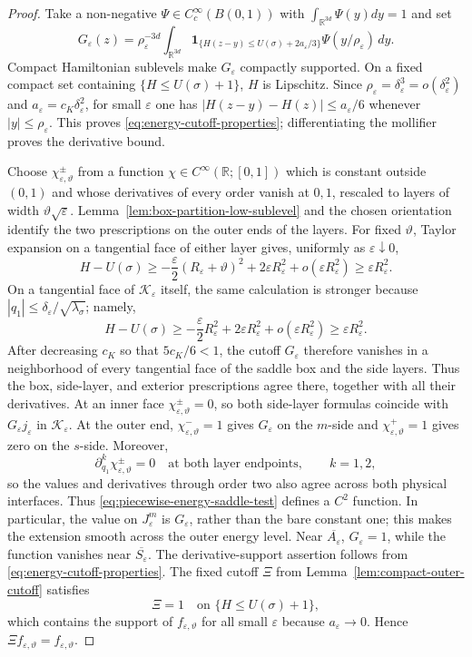 \documentclass[11pt]{article}
\numberwithin{equation}{section}
\theoremstyle{plain}
\theoremstyle{definition}
\theoremstyle{remark}
\newcommand{\R}{\mathbb R}
\newcommand{\eps}{\varepsilon}
\begin{document}
\begin{proof}
Take a non-negative $\Psi\in C_c^\infty(B(0,1))$ with $\int_{\mathbb{R}^{3d}}\Psi(y)dy=1$ and set
\begin{equation}
\label{eq:energy-cutoff-convolution}
G_\eps(z)=\rho_\eps^{-3d}\int_{\R^{3d}}
\mathbf 1_{\{H(z-y)\le U(\sigma)+2a_\eps/3\}}
\Psi(y/\rho_\eps)\,dy .
\end{equation}
Compact Hamiltonian sublevels make $G_\eps$ compactly supported.  On a fixed
compact set containing $\{H\le U(\sigma)+1\}$, $H$ is Lipschitz.  Since
$\rho_\eps=\delta_\eps^3=o(\delta_\eps^2)$ and
$a_\eps=c_K\delta_\eps^2$, for small $\eps$ one has
$|H(z-y)-H(z)|\le a_\eps/6$ whenever $|y|\le\rho_\eps$.
This proves \eqref{eq:energy-cutoff-properties}; differentiating the mollifier
proves the derivative bound.

Choose $\chi_{\eps,\vartheta}^\pm$ from a function
$\chi\in C^\infty(\R;[0,1])$ which is constant outside $(0,1)$ and whose
derivatives of every order vanish at $0,1$, rescaled to layers of width
$\vartheta\sqrt\eps$.  Lemma~\ref{lem:box-partition-low-sublevel} and the chosen
orientation identify the two prescriptions on the outer ends of the layers.
For fixed $\vartheta$, Taylor expansion on a tangential face of either layer
gives, uniformly as $\eps\downarrow0$,
\[
H-U(\sigma)
\ge
-\frac{\eps}{2}(R_\eps+\vartheta)^2
+2\eps R_\eps^2+o(\eps R_\eps^2)
\ge \eps R_\eps^2.
\]
On a tangential face of $\mathcal K_\eps$ itself, the same calculation is
stronger because $|q_1|\le\delta_\eps/\sqrt{\lambda_\sigma}$; namely,
\[
H-U(\sigma)
\ge -\frac{\eps}{2}R_\eps^2+2\eps R_\eps^2
+o(\eps R_\eps^2)
\ge \eps R_\eps^2.
\]
After decreasing $c_K$ so that $5c_K/6<1$, the cutoff $G_\eps$ therefore
vanishes in a neighborhood of every tangential face of the saddle box and
the side layers.  Thus the box, side-layer, and exterior prescriptions agree
there, together with all their derivatives.
At an inner face $\chi_{\eps,\vartheta}^\pm=0$, so both side-layer formulas
coincide with $G_\eps j_\eps$ in $\mathcal K_\eps$.  At the outer end,
$\chi_{\eps,\vartheta}^-=1$ gives $G_\eps$ on the $m$-side and
$\chi_{\eps,\vartheta}^+=1$ gives zero on the $s$-side.  Moreover,
\[
\partial_{q_1}^k\chi_{\eps,\vartheta}^\pm=0
\quad\text{at both layer endpoints},\qquad k=1,2,
\]
so the values and derivatives through order two also agree across both
physical interfaces.
Thus \eqref{eq:piecewise-energy-saddle-test} defines a $C^2$ function.  In
particular, the value on $J_\eps^m$ is $G_\eps$, rather than the bare constant
one; this makes the extension smooth across the outer energy level.  Near
$\overline{A_\eps}$, $G_\eps=1$, while the function vanishes near
$\overline{S_\eps}$.
The derivative-support assertion follows from
\eqref{eq:energy-cutoff-properties}.  The fixed cutoff $\Xi$ from
Lemma~\ref{lem:compact-outer-cutoff} satisfies
\[
\Xi=1\quad\text{on }\{H\le U(\sigma)+1\},
\]
which contains the support of $f_{\eps,\vartheta}$ for all small $\eps$ because
$a_\eps\to0$.  Hence $\Xi f_{\eps,\vartheta}=f_{\eps,\vartheta}$.
\end{proof}
\end{document}
